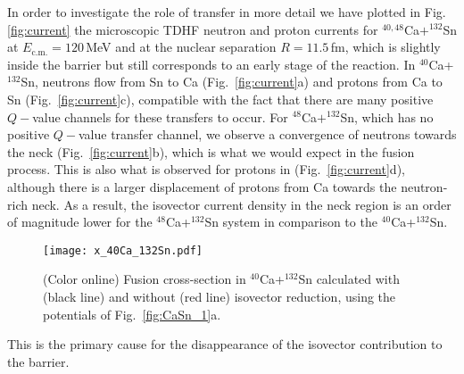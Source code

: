 \documentclass[aps,prl,twocolumn,superscriptaddress,floatfix,10pt]{revtex4-1}
\begin{document}
In order to investigate the role of transfer in more detail we have plotted  in Fig.\,\ref{fig:current}
 the microscopic TDHF neutron and proton currents for $^{40,48}$Ca$+^{132}$Sn
 at  $E_\mathrm{c.m.}=120$\,MeV and  at the nuclear separation $R=11.5$\,fm,
which is slightly inside the barrier but still corresponds to an early stage of the reaction.
In $^{40}$Ca+$^{132}$Sn, neutrons flow from Sn to Ca (Fig.~\ref{fig:current}a) and protons from Ca to Sn (Fig.~\ref{fig:current}c),
compatible with the fact that there are many positive $Q-$value channels for these transfers to occur.
For $^{48}$Ca$+^{132}$Sn, which has no positive $Q-$value transfer channel,
we observe a convergence of neutrons towards the neck (Fig.~\ref{fig:current}b),
which is what we would expect in the fusion process.
This is also what is observed for protons in (Fig.~\ref{fig:current}d),
although there is a larger displacement of protons from Ca towards the
neutron-rich neck. %
As a result, the isovector current density in the neck region is an order of magnitude lower
for the $^{48}$Ca+$^{132}$Sn system in comparison to the $^{40}$Ca+$^{132}$Sn.
\begin{figure}[!htb]
	\centering
	\texttt{[image: x\_40Ca\_132Sn.pdf]}
	\caption{(Color online) Fusion cross-section  in $^{40}$Ca+$^{132}$Sn calculated with (black line) and without (red line) isovector reduction, using the potentials of Fig.~\ref{fig:CaSn_1}a.}
	\label{fig:cs}
\end{figure}
This is the primary cause for the disappearance of the isovector contribution to the barrier.
\end{document}
